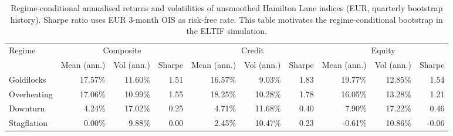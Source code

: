 \begin{table}[htbp]
\centering
\footnotesize
\caption{Regime-conditional annualised returns and volatilities of unsmoothed Hamilton Lane indices (EUR, quarterly bootstrap history). Sharpe ratio uses EUR 3-month OIS as risk-free rate. This table motivates the regime-conditional bootstrap in the ELTIF simulation.}
\label{tab:pm_regime_stats}
\begin{tabular}{lrrr|rrr|rrr}
\toprule
Regime & \multicolumn{3}{c|}{Composite} & \multicolumn{3}{c|}{Credit} & \multicolumn{3}{c}{Equity} \\
 & Mean (ann.) & Vol (ann.) & Sharpe & Mean (ann.) & Vol (ann.) & Sharpe & Mean (ann.) & Vol (ann.) & Sharpe \\
\midrule
Goldilocks & 17.57\% & 11.60\% & 1.51 & 16.57\% & 9.03\% & 1.83 & 19.77\% & 12.85\% & 1.54 \\
Overheating & 17.06\% & 10.99\% & 1.55 & 18.25\% & 10.28\% & 1.78 & 16.05\% & 13.28\% & 1.21 \\
Downturn & 4.24\% & 17.02\% & 0.25 & 4.71\% & 11.68\% & 0.40 & 7.90\% & 17.22\% & 0.46 \\
Stagflation & 0.00\% & 9.88\% & 0.00 & 2.45\% & 10.47\% & 0.23 & -0.61\% & 10.86\% & -0.06 \\
\bottomrule
\end{tabular}
\end{table}
